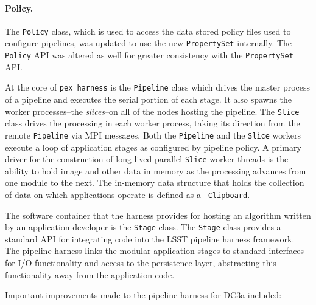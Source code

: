 \paragraph{Policy.}  The {\tt Policy} class, which is used to access
the data stored policy files used to configure pipelines, was updated
to use the new {\tt PropertySet} internally.  The {\tt Policy} API was
altered as well for greater consistency with the {\tt PropertySet}
API.  

 \label{sec:harness}

At the core of {\tt pex\_harness} is the {\tt Pipeline} class which
drives the master process of a pipeline and executes the serial portion of
each stage.  It also spawns the worker processes--the {\it slices}--on
all of the nodes hosting the pipeline.  The {\tt Slice} class drives
the processing in each worker process, taking its direction from the
remote {\tt Pipeline} via MPI messages.  Both the {\tt Pipeline} and
the {\tt Slice} workers execute a loop of application stages as
configured by pipeline policy.  A primary driver for the construction
of long lived parallel {\tt Slice} worker threads is the ability to
hold image and other data in memory as the processing advances from
one module to the next. The in-memory data structure that holds the
collection of data on which applications operate is defined as a {\tt
Clipboard}.

The software container that the harness provides for hosting an
algorithm written by an application developer is the {\tt Stage}
class.  The {\tt Stage} class provides a standard API for integrating
code into the LSST pipeline harness framework.  The pipeline harness
links the modular application stages to standard interfaces for I/O
functionality and access to the persistence layer, abstracting this
functionality away from the application code.

Important improvements made to the pipeline harness for DC3a included:

